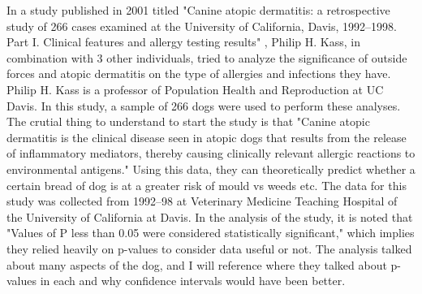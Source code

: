 \documentclass{article}
\numberwithin{equation}{section}
\begin{document}
In a study published in 2001 titled "Canine atopic dermatitis: a retrospective study of 266 cases examined at the University of California, Davis, 1992–1998. Part I. Clinical features and allergy testing results" , Philip H. Kass, in combination with 3 other individuals, tried to analyze the significance of outside forces and atopic dermatitis on the type of allergies and infections they have. Philip H. Kass is a professor of Population Health and Reproduction at UC Davis. In this study, a sample of 266 dogs were used to perform these analyses. The crutial thing to understand to start the study is that "Canine atopic dermatitis is the clinical disease seen in atopic dogs that results from the release of inﬂammatory mediators, thereby causing clinically relevant allergic reactions to environmental antigens." Using this data, they can theoretically predict whether a certain bread of dog is at a greater risk of mould vs weeds etc. The data for this study was collected from 1992–98 at Veterinary Medicine Teaching Hospital of the University of California at Davis. 
In the analysis of the study, it is noted that "Values of  P less than 0.05 were considered statistically signiﬁcant," which implies they relied heavily on p-values to consider data useful or not. The analysis talked about many aspects of the dog, and I will reference where they talked about p-values in each and why confidence intervals would have been better. \\
\end{document}
